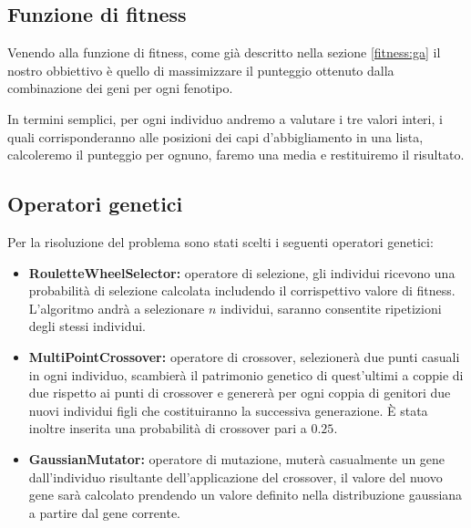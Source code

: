 \documentclass[a4paper, 11pt, oneside]{report}
\begin{document}
                \subsection{Funzione di fitness}
                \par \noindent Venendo alla funzione di fitness, come già descritto nella sezione \ref{fitness:ga} il
                nostro obbiettivo è quello di massimizzare il punteggio ottenuto dalla combinazione dei geni per ogni
                fenotipo.
                \par \noindent In termini semplici, per ogni individuo andremo a valutare i tre valori interi, i quali
                corrisponderanno alle posizioni dei capi d'abbigliamento in una lista, calcoleremo il punteggio per ognuno,
                faremo una media e restituiremo il risultato.

                \subsection{Operatori genetici}
                Per la risoluzione del problema sono stati scelti i seguenti operatori genetici:
                \begin{itemize}
                    \item \textbf{RouletteWheelSelector:} operatore di selezione, gli individui ricevono una probabilità
                    di selezione calcolata includendo il corrispettivo valore di fitness. L'algoritmo andrà a selezionare
                    $n$ individui, saranno consentite ripetizioni degli stessi individui.
                    \item \textbf{MultiPointCrossover:} operatore di crossover, selezionerà due punti casuali in ogni
                    individuo, scambierà il patrimonio genetico di quest'ultimi a coppie di due rispetto ai punti di
                    crossover e genererà per ogni coppia di genitori due nuovi individui figli che costituiranno la
                    successiva generazione. È stata inoltre inserita una probabilità di crossover pari a $0.25$.
                    \item \textbf{GaussianMutator:} operatore di mutazione, muterà casualmente un gene dall'individuo
                    risultante dell'applicazione del crossover, il valore del nuovo gene sarà calcolato prendendo un
                    valore definito nella distribuzione gaussiana a partire dal gene corrente.
                \end{itemize}
\end{document}
